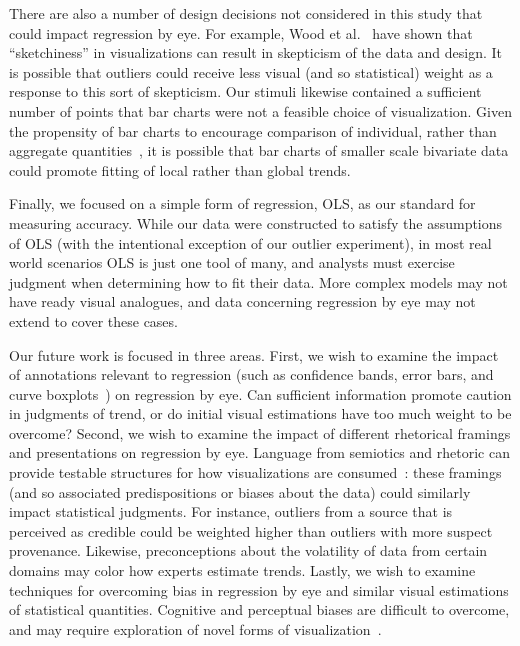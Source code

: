 \documentclass{sigchi}
\begin{document}
There are also a number of design decisions not considered in this study that could impact regression by eye. For example, Wood et al.~\cite{wood2012sketchy} have shown that ``sketchiness'' in visualizations can result in skepticism of the data and design. It is possible that outliers could receive less visual (and so statistical) weight as a response to this sort of skepticism. Our stimuli likewise contained a sufficient number of points that bar charts were not a feasible choice of visualization. Given the propensity of bar charts to encourage comparison of individual, rather than aggregate quantities~\cite{zacks1999bars}, it is possible that bar charts of smaller scale bivariate data could promote fitting of local rather than global trends.

Finally, we focused on a simple form of regression, OLS, as our standard for measuring accuracy. While our data were constructed to satisfy the assumptions of OLS (with the intentional exception of our outlier experiment), in most real world scenarios OLS is just one tool of many, and analysts must exercise judgment when determining how to fit their data. More complex models may not have ready visual analogues, and data concerning regression by eye may not extend to cover these cases.

Our future work is focused in three areas. First, we wish to examine the impact of annotations relevant to regression (such as confidence bands, error bars, and curve boxplots~\cite{mirzargar2014curve}) on regression by eye. Can sufficient information promote caution in judgments of trend, or do initial visual estimations have too much weight to be overcome? Second, we wish to examine the impact of different rhetorical framings and presentations on regression by eye. Language from semiotics and rhetoric can provide testable structures for how visualizations are consumed~\cite{hullman2011visualization}: these framings (and so associated predispositions or biases about the data) could similarly impact statistical judgments. For instance, outliers from a source that is perceived as credible could be weighted higher than outliers with more suspect provenance. Likewise, preconceptions about the volatility of data from certain domains may color how experts estimate trends. Lastly, we wish to examine techniques for overcoming bias in regression by eye and similar visual estimations of statistical quantities. Cognitive and perceptual biases are difficult to overcome, and may require exploration of novel forms of visualization~\cite{micallef2012assessing}.
\end{document}
